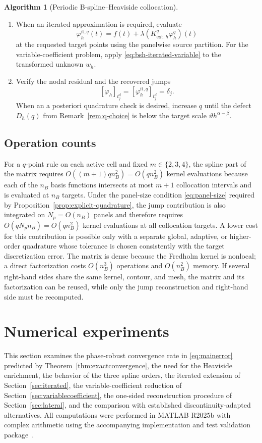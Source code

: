 \documentclass[11pt,a4paper]{amsart}
\theoremstyle{plain}
\theoremstyle{definition}
\newtheorem{algorithm}[theorem]{Algorithm}
\theoremstyle{remark}
\begin{document}
\begin{algorithm}[Periodic B-spline--Heaviside collocation]
\begin{enumerate}[label=\textbf{Step \arabic*.},leftmargin=2.6cm]
\item When an iterated approximation is required, evaluate
\[
        \varphi_h^{\mathrm{it},q}(t)
        =f(t)+\lambda(K_{\mathrm{ext},h}^q\varphi_h^q)(t)
\]
at the requested target points using the panelwise source partition.  For the
variable-coefficient problem, apply \eqref{eq:bsh-iterated-variable} to the
transformed unknown $w_h$.

\item Verify the nodal residual and the recovered jumps
\[
        [\varphi_h]_{t_j^d}
        =[\varphi_h^{\mathrm{it},q}]_{t_j^d}
        =\delta_j.
\]
When an a posteriori quadrature check is desired, increase $q$ until the
defect $D_h(q)$ from Remark~\ref{rem:q-choice} is below the target scale
$\vartheta h^{\alpha-\beta}$.
\end{enumerate}
\end{algorithm}

\subsection*{Operation counts}
For a $q$-point rule on each active cell and fixed $m\in\{2,3,4\}$, the spline part of the matrix requires $O((m+1)qn_B^2)=O(qn_B^2)$ kernel evaluations because each of the $n_B$ basis functions intersects at most $m+1$ collocation intervals and is evaluated at $n_B$ targets.  Under the panel-size condition \eqref{eq:panel-size} required by Proposition~\ref{prop:explicit-quadrature}, the jump contribution is also integrated on $N_p=O(n_B)$ panels and therefore requires $O(qN_pn_B)=O(qn_B^2)$ kernel evaluations at all collocation targets.  A lower cost for this contribution is possible only with a separate global, adaptive, or higher-order quadrature whose tolerance is chosen consistently with the target discretization error.  The matrix is dense because the Fredholm kernel is nonlocal; a direct factorization costs $O(n_B^3)$ operations and $O(n_B^2)$ memory.  If several right-hand sides share the same kernel, contour, and mesh, the matrix and its factorization can be reused, while only the jump reconstruction and right-hand side must be recomputed.

\section{Numerical experiments}\label{sec:numerics}

This section examines the phase-robust convergence rate in \eqref{eq:mainerror} predicted by
Theorem~\ref{thm:exactconvergence}, the need for the Heaviside enrichment, the
behavior of the three spline orders, the iterated extension of
Section~\ref{sec:iterated}, the variable-coefficient reduction of
Section~\ref{sec:variablecoefficient}, the one-sided reconstruction
procedure of Section~\ref{sec:lateral}, and the comparison with established
discontinuity-adapted alternatives.  All computations were performed in
MATLAB R2025b with complex arithmetic using the accompanying implementation
and test validation package~\cite{CapceleaCapceleaSoftware2026}.
\end{document}
